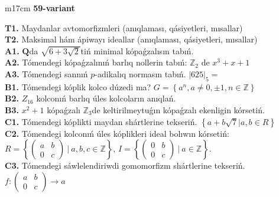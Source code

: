 \documentclass{article}
\begin{document}
\begin{tabular}{m{17cm}}
\textbf{59-variant}
\newline

\textbf{T1.} Maydanlar avtomorfizmleri (anıqlaması, qásiyetleri, mısallar) \\
\textbf{T2.} Maksimal hám ápiwayı ideallar (anıqlaması, qásiyetleri, mısallar) \\
\textbf{A1.} \(\mathbf{Q}\)da \(\sqrt{6 + 3\sqrt{2}}\)tiń minimal kópaǵzalısın tabıń. \\
\textbf{A2.} Tómendegi kópaǵzalınıń barlıq nollerin tabıń: \(\mathbb{Z}_{2}\) de \(x^{3} + x + 1\) \\
\textbf{A3.} Tómendegi sannıń \(p\)-adikalıq normasın tabıń. \(|625|_{5} =\) \\
\textbf{B1.} Tómendegi kóplik kolco dúzedi ma? \(G = \left\{ a^{n},a \neq 0, \pm 1,n \in \mathbb{Z} \right\}\) \\
\textbf{B2.} \(Z_{16}\) kolconıń barlıq úles kolcoların anıqlań. \\
\textbf{B3.} \(x^{2} + 1\) kópaǵzalı \(\mathbb{Z}_{3}\)de keltirilmeytuǵın kópaǵzalı ekenligin kórsetiń. \\
\textbf{C1.} Tómendegi kóplikti maydan shártlerine tekseriń. \(\left\{ a + b\sqrt{7}|a,b \in R \right\}\) \\
\textbf{C2.} Tómendegi kolconıń úles kóplikleri ideal bolıwın kórsetiń:
\(R = \left\{ \begin{pmatrix}
a & b \\
0 & c
\end{pmatrix}\ |\ a,b,c \in \mathbb{Z} \right\}\), \(I = \left\{ \begin{pmatrix}
0 & b \\
0 & c
\end{pmatrix}\ |\ a \in \mathbb{Z} \right\}\). \\
\textbf{C3.} Tómendegi sáwlelendiriwdi gomomorfizm shártlerine tekseriń. \(f:\begin{pmatrix}
a & b \\
0 & c
\end{pmatrix} \rightarrow a\) \\

\end{tabular}
\vspace{1cm}
\end{document}
